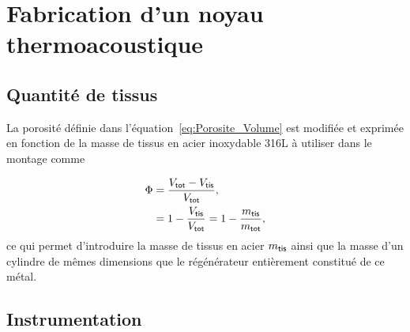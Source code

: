 \chapter{Fabrication d'un noyau thermoacoustique}
\mylocaltoc

\section{Quantité de tissus}
La porosité définie dans l'équation~\eqref{eq:Porosite_Volume} est modifiée et exprimée en fonction de la masse de tissus en acier inoxydable 316L à utiliser dans le montage comme

\begin{align}
	\Phi &= \frac{V_{\sf tot} - V_{\sf tis}}{V_{\sf tot}},\nonumber\\
		&= 1 - \frac{V_{\sf tis}}{V_{\sf tot}} = 1 - \frac{m_{\sf tis}}{m_{\sf tot}},\label{eq:Porisite_Masse}
\end{align}
ce qui permet d'introduire la masse de tissus en acier $m_{\sf tis}$ ainsi que la masse d'un cylindre de mêmes dimensions que le régénérateur entièrement constitué de ce métal.

\section{Instrumentation}